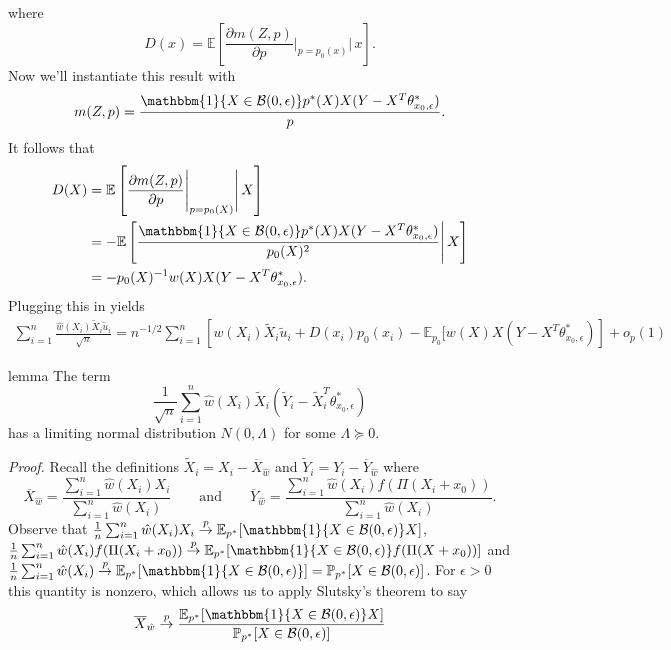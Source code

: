 \documentclass[11pt]{article}
\begin{document}
where 
\begin{equation}
    D(x) = \mathbb{E}\left[ \frac{\partial m(Z,p) }{\partial p}\Bigg|_{p = p_0(x)}\Bigg| \, x\right].
\end{equation}
Now we'll instantiate this result with 
\[m(Z, p) = \frac{\mathbbm{1}\{X \in \mathcal{B}(0, \epsilon)\}p^*(X)X(Y-X^T\theta^*_{x_0, \epsilon})}{p}.\]
It follows that
\begin{align*}
    D(X) &= \mathbb{E}\left[ \frac{\partial m(Z,p) }{\partial p}\Bigg|_{p = p_0(X)}\Bigg| \, X\right] \\
    &= -\mathbb{E}\left[ \frac{\mathbbm{1}\{X \in \mathcal{B}(0, \epsilon)\}p^*(X)X(Y-X^T\theta^*_{x_0, \epsilon})}{p_0(X)^2} \Bigg| \, X\right] \\
    &= -p_0(X)^{-1}w(X)X(Y - X^T\theta^*_{x_0, \epsilon}).
\end{align*}
Plugging this in yields
\begin{align}
    \sum_{i = 1}^n\frac{\hat{w}(X_i)\tilde{X}_i\tilde{u}_i}{\sqrt{n}} = n^{-1/2}\sum_{i = 1}^n \left[ w(X_i)\tilde{X}_i\tilde{u}_i + D(x_i)p_0(x_i) - \mathbb{E}_{p_0}[w(X)X(Y - X^T\theta^*_{x_0, \epsilon})\right] + o_p(1)
\end{align}

\begin{restatable}{lemma}{}
    The term
    \[\frac{1}{\sqrt{n}}\sum_{i=1}^n \hat{w}(X_i)\tilde{X}_i\left(\tilde{Y}_i - \tilde{X}_i^T\theta^*_{x_0, \epsilon}\right)\]
    has a limiting normal distribution $N(0, \Lambda)$ for some $\Lambda \succeq 0$. 
\end{restatable}
\noindent \textit{Proof.} Recall the definitions $\tilde{X}_i = X_i - \overline{X}_{\hat{w}}$ and $\tilde{Y}_i = Y_i - \overline{Y}_{\hat{w}}$
where
\begin{equation}
    \overline{X}_{\hat{w}} = \frac{\sum_{i = 1}^n \hat{w}(X_i)X_i}{\sum_{i = 1}^n \hat{w}(X_i)} \qquad \text{and} \qquad \overline{Y}_{\hat{w}} = \frac{\sum_{i = 1}^n \hat{w}(X_i)f(\Pi(X_i + x_0))}{\sum_{i = 1}^n \hat{w}(X_i)}.
\end{equation}
Observe that $\frac{1}{n}\sum_{i = 1}^n\hat{w}(X_i)X_i \overset{p}{\rightarrow} \mathbb{E}_{p^*}[\mathbbm{1}\{X \in \mathcal{B}(0, \epsilon)\}X]$, $\frac{1}{n}\sum_{i = 1}^n\hat{w}(X_i)f(\Pi(X_i + x_0)) \overset{p}{\rightarrow} \mathbb{E}_{p^*}[\mathbbm{1}\{X \in \mathcal{B}(0, \epsilon)\}f(\Pi(X+x_0))]$ and $\frac{1}{n}\sum_{i = 1}^n\hat{w}(X_i) \overset{p}{\rightarrow} \mathbb{E}_{p^*}[\mathbbm{1}\{X \in \mathcal{B}(0, \epsilon)\}] = \mathbb{P}_{p^*}[X \in \mathcal{B}(0, \epsilon)]$. For $\epsilon > 0$ this quantity is nonzero, which allows us to apply Slutsky's theorem to say
\[\overline{X}_{\hat{w}} \overset{p}{\rightarrow} \frac{\mathbb{E}_{p^*}[\mathbbm{1}\{X \in \mathcal{B}(0, \epsilon)\}X]}{\mathbb{P}_{p^*}[X \in \mathcal{B}(0, \epsilon)]}\]
\end{document}
